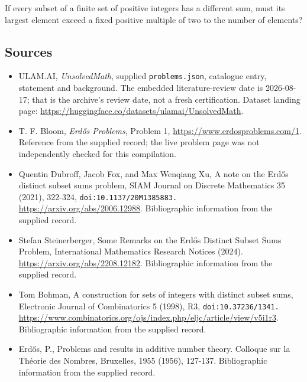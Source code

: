 \documentclass[11pt,a4paper]{article}
\begin{document}
If every subset of a finite set of positive integers has a different sum, must its largest element exceed a fixed positive multiple of two to the number of elements?

\subsection{Sources}

{\small

\begin{itemize}

\item[\hypertarget{source:statement:1}{S1}] ULAM.AI, \emph{UnsolvedMath}, supplied \texttt{problems.json}, catalogue entry, statement and background. The embedded literature-review date is 2026-08-17; that is the archive’s review date, not a fresh certification. Dataset landing page: \url{https://huggingface.co/datasets/ulamai/UnsolvedMath}.

\item[\hypertarget{source:statement:2}{S2}] T. F. Bloom, \emph{Erdős Problems}, Problem 1, \url{https://www.erdosproblems.com/1}. Reference from the supplied record; the live problem page was not independently checked for this compilation.

\item[\hypertarget{source:statement:3}{S3}] Quentin Dubroff, Jacob Fox, and Max Wenqiang Xu, A note on the Erdős distinct subset sums problem, SIAM Journal on Discrete Mathematics 35 (2021), 322-324, \nolinkurl{doi:10.1137/20M1385883.} \url{https://arxiv.org/abs/2006.12988}. Bibliographic information from the supplied record.

\item[\hypertarget{source:statement:4}{S4}] Stefan Steinerberger, Some Remarks on the Erdős Distinct Subset Sums Problem, International Mathematics Research Notices (2024). \url{https://arxiv.org/abs/2208.12182}. Bibliographic information from the supplied record.

\item[\hypertarget{source:statement:5}{S5}] Tom Bohman, A construction for sets of integers with distinct subset sums, Electronic Journal of Combinatorics 5 (1998), R3, \nolinkurl{doi:10.37236/1341.} \url{https://www.combinatorics.org/ojs/index.php/eljc/article/view/v5i1r3}. Bibliographic information from the supplied record.

\item[\hypertarget{source:statement:6}{S6}] Erd\H{o}s, P., Problems and results in additive number theory. Colloque sur la Th\'{e}orie des Nombres, Bruxelles, 1955 (1956), 127-137. Bibliographic information from the supplied record.

\end{itemize}

}

\label{end:statement}
\end{document}
